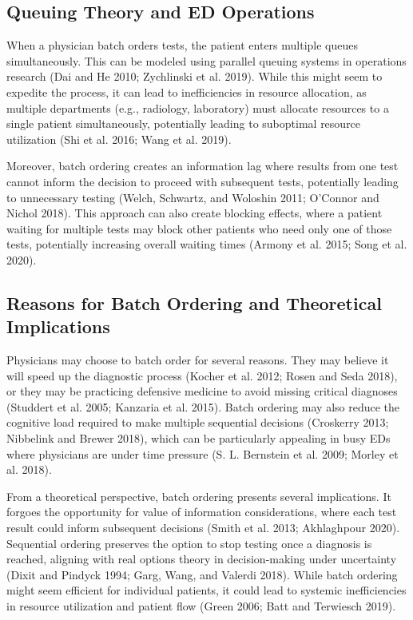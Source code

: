 \documentclass{article}
\begin{document}
\hypertarget{queuing-theory-and-ed-operations}{%
\subsection{Queuing Theory and ED
Operations}\label{queuing-theory-and-ed-operations}}

When a physician batch orders tests, the patient enters multiple queues
simultaneously. This can be modeled using parallel queuing systems in
operations research (Dai and He 2010; Zychlinski et al. 2019). While
this might seem to expedite the process, it can lead to inefficiencies
in resource allocation, as multiple departments (e.g., radiology,
laboratory) must allocate resources to a single patient simultaneously,
potentially leading to suboptimal resource utilization (Shi et al. 2016;
Wang et al. 2019).

Moreover, batch ordering creates an information lag where results from
one test cannot inform the decision to proceed with subsequent tests,
potentially leading to unnecessary testing (Welch, Schwartz, and
Woloshin 2011; O'Connor and Nichol 2018). This approach can also create
blocking effects, where a patient waiting for multiple tests may block
other patients who need only one of those tests, potentially increasing
overall waiting times (Armony et al. 2015; Song et al. 2020).

\hypertarget{reasons-for-batch-ordering-and-theoretical-implications}{%
\subsection{Reasons for Batch Ordering and Theoretical
Implications}\label{reasons-for-batch-ordering-and-theoretical-implications}}

Physicians may choose to batch order for several reasons. They may
believe it will speed up the diagnostic process (Kocher et al. 2012;
Rosen and Seda 2018), or they may be practicing defensive medicine to
avoid missing critical diagnoses (Studdert et al. 2005; Kanzaria et al.
2015). Batch ordering may also reduce the cognitive load required to
make multiple sequential decisions (Croskerry 2013; Nibbelink and Brewer
2018), which can be particularly appealing in busy EDs where physicians
are under time pressure (S. L. Bernstein et al. 2009; Morley et al.
2018).

From a theoretical perspective, batch ordering presents several
implications. It forgoes the opportunity for value of information
considerations, where each test result could inform subsequent decisions
(Smith et al. 2013; Akhlaghpour 2020). Sequential ordering preserves the
option to stop testing once a diagnosis is reached, aligning with real
options theory in decision-making under uncertainty (Dixit and Pindyck
1994; Garg, Wang, and Valerdi 2018). While batch ordering might seem
efficient for individual patients, it could lead to systemic
inefficiencies in resource utilization and patient flow (Green 2006;
Batt and Terwiesch 2019).
\end{document}
